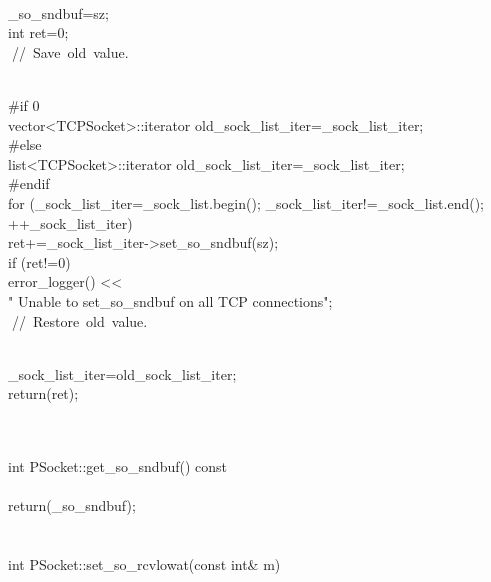\documentclass{article}
\begin{document}
 {
\\
     _so_sndbuf=sz;
\\
         int ret=0;
\\
         
\hbox{// Save old value.}\strut\\
 #if 0
\\
         vector<TCPSocket>::iterator old_sock_list_iter=_sock_list_iter;
\\
 #else
\\
         list<TCPSocket>::iterator old_sock_list_iter=_sock_list_iter;
\\
 #endif
\\
     for (_sock_list_iter=_sock_list.begin(); _sock_list_iter!=_sock_list.end();
\\
          ++_sock_list_iter)
\\
         ret+=_sock_list_iter->set_so_sndbuf(sz);
\\
     if (ret!=0)
\\
         error_logger() << 
\\
                                 "    Unable to set_so_sndbuf on all TCP connections\n";
\\
         
\hbox{// Restore old value.}\strut\\
         _sock_list_iter=old_sock_list_iter;
\\
         return(ret);
\\
 }
\\
 
\\
 int PSocket::get_so_sndbuf() const
\\
 {
\\
         return(_so_sndbuf);
\\
 }
\\
 
\\
 int PSocket::set_so_rcvlowat(const int& m)
\\
\end{document}
